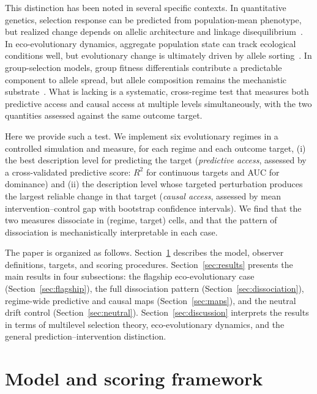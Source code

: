 \documentclass[11pt,a4paper]{article}
\begin{document}
This distinction has been noted in several specific contexts.
In quantitative genetics, selection response can be predicted from population-mean
phenotype, but realized change depends on allelic architecture and linkage
disequilibrium~\citep{Turelli1994, Hansen2006, deVladar2011}.
In eco-evolutionary dynamics, aggregate population state can track ecological
conditions well, but evolutionary change is ultimately driven by allele
sorting~\citep{Ellner2011, Pelletier2009, Hairston2005}.
In group-selection models, group fitness differentials contribute a predictable
component to allele spread, but allele composition remains the mechanistic
substrate~\citep{Price1970, Okasha2006, West2007}.
What is lacking is a systematic, cross-regime test that measures both predictive
access and causal access at multiple levels simultaneously, with the two
quantities assessed against the same outcome target.

Here we provide such a test.
We implement six evolutionary regimes in a controlled simulation and measure,
for each regime and each outcome target, (i) the best description level for
predicting the target (\emph{predictive access}, assessed by a cross-validated
predictive score: $R^2$ for continuous targets and AUC for dominance) and (ii) the description level whose targeted perturbation produces
the largest reliable change in that target (\emph{causal access}, assessed
by mean intervention--control gap with bootstrap confidence intervals).
We find that the two measures dissociate in \NcellsDiss{} (regime, target)
cells, and that the pattern of dissociation is mechanistically interpretable
in each case.

The paper is organized as follows.
Section~\ref{sec:methods} describes the model, observer definitions, targets,
and scoring procedures.
Section~\ref{sec:results} presents the main results in four subsections:
the flagship eco-evolutionary case (Section~\ref{sec:flagship}),
the full dissociation pattern (Section~\ref{sec:dissociation}),
regime-wide predictive and causal maps (Section~\ref{sec:maps}),
and the neutral drift control (Section~\ref{sec:neutral}).
Section~\ref{sec:discussion} interprets the results in terms of multilevel
selection theory, eco-evolutionary dynamics, and the general prediction--intervention
distinction.

\section{Model and scoring framework}
\label{sec:methods}
\end{document}

